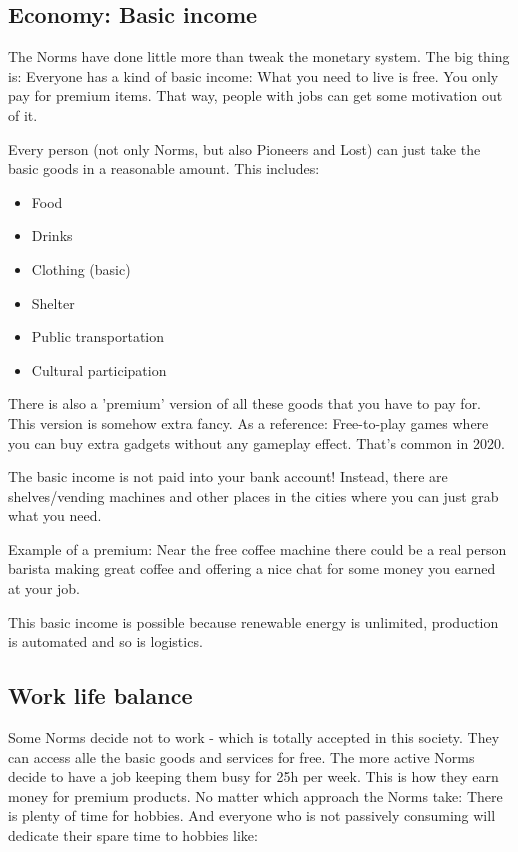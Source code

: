 \subsection{Economy: Basic income}
\label{sec:basic income}

The Norms have done little more than tweak the monetary system. The big thing is: Everyone has a kind of basic income: What you need to live is free.
You only pay for premium items. That way, people with jobs can get some motivation out of it.

Every person (not only Norms, but also Pioneers and Lost) can just take the basic goods in a reasonable amount. This includes:

\begin{itemize}
    \item Food
    \item Drinks
    \item Clothing (basic)
    \item Shelter
    \item Public transportation
    \item Cultural participation
\end{itemize}

There is also a 'premium' version of all these goods that you have to pay for. This version is somehow extra fancy. As a reference: Free-to-play games where you can buy extra gadgets without any gameplay effect. That's common in 2020.

The basic income is not paid into your bank account! Instead, there are shelves/vending machines and other places in the cities where you can just grab what you need.

Example of a premium: Near the free coffee machine there could be a real person barista making great coffee and offering a nice chat for some money you earned at your job.

This basic income is possible because renewable energy is unlimited, production is automated and so is logistics.

\subsection{Work life balance}

Some Norms decide not to work - which is totally accepted in this society. They can access alle the basic goods and services for free.
The more active Norms decide to have a job keeping them busy for 25h per week. This is how they earn money for premium products. No matter which approach the Norms take: There is plenty of time for hobbies. And everyone who is not passively consuming will dedicate their spare time to hobbies like:

